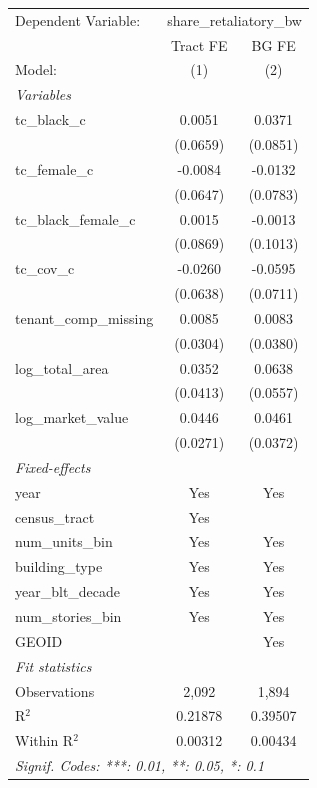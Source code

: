 \par\endgroup
\begingroup
\centering
\begin{tabular}{lcc}
   \tabularnewline \midrule \midrule
   Dependent Variable: & \multicolumn{2}{c}{share\_retaliatory\_bw}\\
                           & Tract FE & BG FE \\   
   Model:                  & (1)      & (2)\\  
   \midrule
   \emph{Variables}\\
   tc\_black\_c            & 0.0051   & 0.0371\\   
                           & (0.0659) & (0.0851)\\   
   tc\_female\_c           & -0.0084  & -0.0132\\   
                           & (0.0647) & (0.0783)\\   
   tc\_black\_female\_c    & 0.0015   & -0.0013\\   
                           & (0.0869) & (0.1013)\\   
   tc\_cov\_c              & -0.0260  & -0.0595\\   
                           & (0.0638) & (0.0711)\\   
   tenant\_comp\_missing   & 0.0085   & 0.0083\\   
                           & (0.0304) & (0.0380)\\   
   log\_total\_area        & 0.0352   & 0.0638\\   
                           & (0.0413) & (0.0557)\\   
   log\_market\_value      & 0.0446   & 0.0461\\   
                           & (0.0271) & (0.0372)\\   
   \midrule
   \emph{Fixed-effects}\\
   year                    & Yes      & Yes\\  
   census\_tract           & Yes      & \\  
   num\_units\_bin         & Yes      & Yes\\  
   building\_type          & Yes      & Yes\\  
   year\_blt\_decade       & Yes      & Yes\\  
   num\_stories\_bin       & Yes      & Yes\\  
   GEOID                   &          & Yes\\  
   \midrule
   \emph{Fit statistics}\\
   Observations            & 2,092    & 1,894\\  
   R$^2$                   & 0.21878  & 0.39507\\  
   Within R$^2$            & 0.00312  & 0.00434\\  
   \midrule \midrule
   \multicolumn{3}{l}{\emph{Signif. Codes: ***: 0.01, **: 0.05, *: 0.1}}\\
\end{tabular}
\par\endgroup
